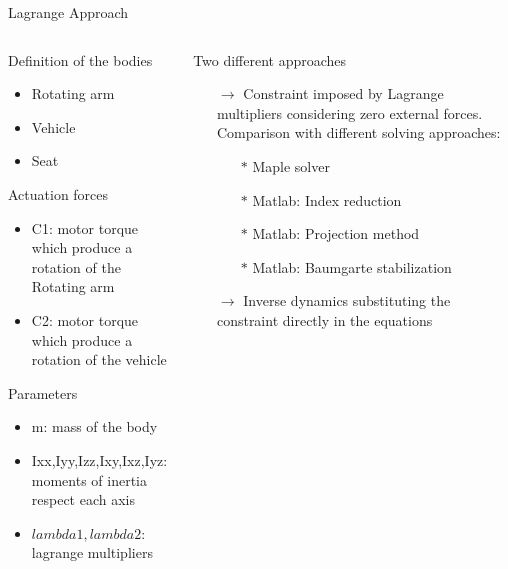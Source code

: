 \documentclass{beamer}              %
\begin{document}
	\begin{frame}{Lagrange Approach}
		\scriptsize	
		\begin{columns}
			\begin{column}[T]{0.5\textwidth}
				\begin{block}{\small Definition of the bodies}	
					\begin{itemize}
						\item Rotating arm 					
						\item Vehicle					
						\item Seat
					\end{itemize}
				\end{block}
				\begin{block}{\small Actuation forces}\scriptsize		
					\begin{itemize}
						\item C1: motor torque which produce a rotation of the Rotating arm 				
						\item C2: motor torque which produce a rotation of the vehicle					
					\end{itemize}
				\end{block}
				\begin{block}{\small Parameters}\scriptsize		
					\begin{itemize}
						\item m: mass of the body			
						\item Ixx,Iyy,Izz,Ixy,Ixz,Iyz: moments of inertia respect each axis
						\item $lambda1,lambda2$: lagrange multipliers
					\end{itemize}
				\end{block}
			\end{column}
			\begin{column}[T]{0.5\textwidth}
		    	\begin{block}{\small Two different approaches}
			    	\begin{itemize}
			    		\item[$\rightarrow$] Constraint imposed by Lagrange multipliers considering zero external forces. Comparison with different solving approaches:
			    		\begin{itemize}
			    			\scriptsize
			    			\item[$\ast$] Maple solver
			    			\item[$\ast$] Matlab: Index reduction
			    			\item[$\ast$] Matlab: Projection method 
			    			\item[$\ast$] Matlab: Baumgarte stabilization
			    		\end{itemize}
					   \item[$\rightarrow$] Inverse dynamics substituting the constraint directly in the equations
			    	\end{itemize}
		  		\end{block}
			\end{column}
		\end{columns} 	
	\end{frame}	
\end{document}
